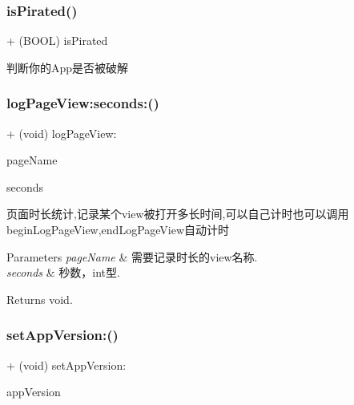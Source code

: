 \subsubsection{\texorpdfstring{is\+Pirated()}{isPirated()}}
{\footnotesize\ttfamily + (B\+O\+OL) is\+Pirated \begin{DoxyParamCaption}{ }\end{DoxyParamCaption}}

判断你的\+App是否被破解 \mbox{\label{interfaceMobClick_a6562f7da7a0c79dbc384db83548aafce}} 
\subsubsection{\texorpdfstring{log\+Page\+View\+:seconds\+:()}{logPageView:seconds:()}}
{\footnotesize\ttfamily + (void) log\+Page\+View\+: \begin{DoxyParamCaption}\item[{(N\+S\+String $\ast$)}]{page\+Name }\item[{seconds:(int)}]{seconds }\end{DoxyParamCaption}}

页面时长统计,记录某个view被打开多长时间,可以自己计时也可以调用begin\+Log\+Page\+View,end\+Log\+Page\+View自动计时


\begin{DoxyParams}{Parameters}
{\em page\+Name} & 需要记录时长的view名称. \\
\hline
{\em seconds} & 秒数，int型. \\
\hline
\end{DoxyParams}
\begin{DoxyReturn}{Returns}
void. 
\end{DoxyReturn}
\mbox{\label{interfaceMobClick_a934922e6c7dc1b8f34e02dcb82968ed6}} 
\subsubsection{\texorpdfstring{set\+App\+Version\+:()}{setAppVersion:()}}
{\footnotesize\ttfamily + (void) set\+App\+Version\+: \begin{DoxyParamCaption}\item[{(N\+S\+String $\ast$)}]{app\+Version }\end{DoxyParamCaption}}

